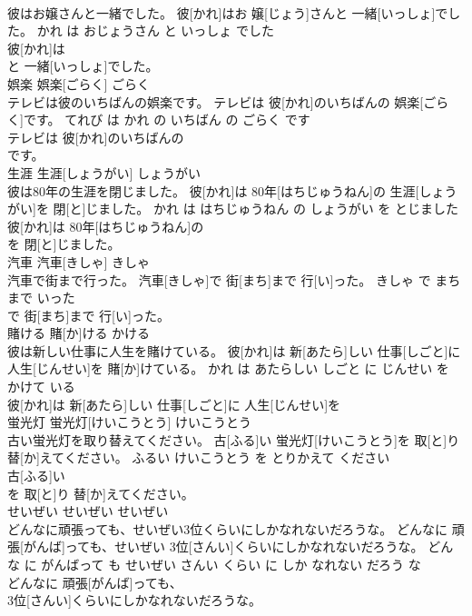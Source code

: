 \documentclass[8pt]{extreport}
\begin{document}
\begin{CJK}{UTF8}{min}
\\	彼はお嬢さんと一緒でした。	彼[かれ]はお 嬢[じょう]さんと 一緒[いっしょ]でした。	かれ は おじょうさん と いっしょ でした	
\\	彼[かれ]は
\\	と 一緒[いっしょ]でした。			
\\	娯楽	娯楽[ごらく]	ごらく	
\\	テレビは彼のいちばんの娯楽です。	テレビは 彼[かれ]のいちばんの 娯楽[ごらく]です。	てれび は かれ の いちばん の ごらく です	
\\	テレビは 彼[かれ]のいちばんの
\\	です。			
\\	生涯	生涯[しょうがい]	しょうがい	
\\	彼は80年の生涯を閉じました。	彼[かれ]は 80年[はちじゅうねん]の 生涯[しょうがい]を 閉[と]じました。	かれ は はちじゅうねん の しょうがい を とじました	
\\	彼[かれ]は 80年[はちじゅうねん]の
\\	を 閉[と]じました。			
\\	汽車	汽車[きしゃ]	きしゃ	
\\	汽車で街まで行った。	汽車[きしゃ]で 街[まち]まで 行[い]った。	きしゃ で まち まで いった	
\\	で 街[まち]まで 行[い]った。			
\\	賭ける	賭[か]ける	かける	
\\	彼は新しい仕事に人生を賭けている。	彼[かれ]は 新[あたら]しい 仕事[しごと]に 人生[じんせい]を 賭[か]けている。	かれ は あたらしい しごと に じんせい を かけて いる	
\\	彼[かれ]は 新[あたら]しい 仕事[しごと]に 人生[じんせい]を
\\	蛍光灯	蛍光灯[けいこうとう]	けいこうとう	
\\	古い蛍光灯を取り替えてください。	古[ふる]い 蛍光灯[けいこうとう]を 取[と]り 替[か]えてください。	ふるい けいこうとう を とりかえて ください	
\\	古[ふる]い
\\	を 取[と]り 替[か]えてください。			
\\	せいぜい	せいぜい	せいぜい	
\\	どんなに頑張っても、せいぜい3位くらいにしかなれないだろうな。	どんなに 頑張[がんば]っても、せいぜい 3位[さんい]くらいにしかなれないだろうな。	どんな に がんばって も せいぜい さんい くらい に しか なれない だろう な	
\\	どんなに 頑張[がんば]っても、
\\	3位[さんい]くらいにしかなれないだろうな。			

\end{CJK}
\end{document}
